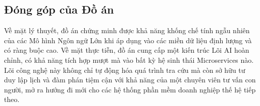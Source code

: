 \subsection{Đóng góp của Đồ án}

Về mặt lý thuyết, đồ án chứng minh được khả năng khống chế tính ngẫu nhiên của các Mô hình Ngôn ngữ Lớn khi áp dụng vào các miền dữ liệu định lượng và có ràng buộc cao. Về mặt thực tiễn, đồ án cung cấp một kiến trúc Lõi AI hoàn chỉnh, có khả năng tích hợp mượt mà vào bất kỳ hệ sinh thái Microservices nào. Lõi công nghệ này không chỉ tự động hóa quá trình tra cứu mà còn sở hữu tư duy lập lịch và đàm phán tiệm cận với khả năng của một chuyên viên tư vấn con người, mở ra hướng đi mới cho các hệ thống phần mềm doanh nghiệp thế hệ tiếp theo.
